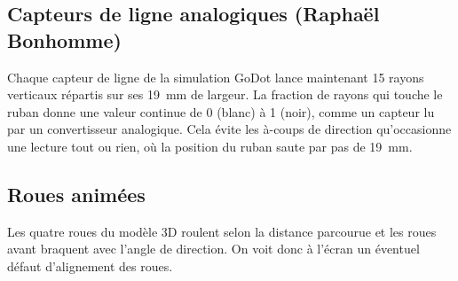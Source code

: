\subsection{Capteurs de ligne analogiques (Raphaël Bonhomme)}
Chaque capteur de ligne de la simulation GoDot lance maintenant 15 rayons verticaux répartis sur ses 19~mm de largeur.
La fraction de rayons qui touche le ruban donne une valeur continue de 0 (blanc) à 1 (noir), comme un capteur lu par un convertisseur analogique.
Cela évite les à-coups de direction qu'occasionne une lecture tout ou rien, où la position du ruban saute par pas de 19~mm.

\subsection{Roues animées}
Les quatre roues du modèle 3D roulent selon la distance parcourue et les roues avant braquent avec l'angle de direction.
On voit donc à l'écran un éventuel défaut d'alignement des roues.
